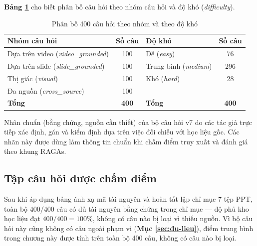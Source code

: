 \bigbreak\noindent
\textbf{Bảng \ref{tab:required-sources-v7}} cho biết phân bố câu hỏi theo nhóm câu hỏi và độ khó (\textit{difficulty}).

\begin{table}[ht]
    \centering
    \caption{Phân bố 400 câu hỏi theo nhóm và theo độ khó}
    \label{tab:required-sources-v7}
    \begin{tabular}{|l|c||l|c|}
        \hline
        \textbf{Nhóm câu hỏi}                     & \textbf{Số câu} & \textbf{Độ khó}              & \textbf{Số câu} \\
        \hline
        Dựa trên video (\textit{video\_grounded}) & 100             & Dễ (\textit{easy})           & 76              \\
        \hline
        Dựa trên slide (\textit{slide\_grounded}) & 100             & Trung bình (\textit{medium}) & 296             \\
        \hline
        Thị giác (\textit{visual})                & 100             & Khó (\textit{hard})          & 28              \\
        \hline
        Đa nguồn (\textit{cross\_source})         & 100             &                              &                 \\
        \hline
        \textbf{Tổng}                             & \textbf{400}    & \textbf{Tổng}                & \textbf{400}    \\
        \hline
    \end{tabular}
\end{table}

\bigbreak\noindent
Nhãn chuẩn (bằng chứng, nguồn cần thiết) của bộ câu hỏi v7 do các tác giả trực tiếp xác định, gán và kiểm định dựa trên việc đối chiếu với học liệu gốc. Các nhãn này được dùng làm thông tin chuẩn khi chấm điểm truy xuất và đánh giá theo khung RAGAs.

\subsection{Tập câu hỏi được chấm điểm}

Sau khi áp dụng bảng ánh xạ mã tài nguyên và hoàn tất lập chỉ mục 7 tệp PPT, toàn bộ 400/400 câu có đủ tài nguyên bằng chứng trong chỉ mục — độ phủ kho học liệu đạt $400/400 = 100\%$, không có câu nào bị loại vì thiếu nguồn. Vì bộ câu hỏi này cũng không có câu ngoài phạm vi (\textbf{Mục \ref{sec:du-lieu}}), điểm trung bình trong chương này được tính trên toàn bộ 400 câu, không có câu nào bị loại.

